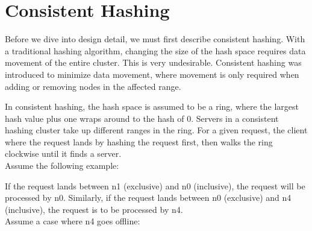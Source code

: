 \section{Consistent Hashing}

Before we dive into design detail, we must first describe consistent hashing.
With a traditional hashing algorithm, changing the size of the hash space
requires data movement of the entire cluster. This is very undesirable.
Consistent hashing was introduced to minimize data movement, where movement is
only required when adding or removing nodes in the affected range. 

In consistent hashing, the hash space is assumed to be a ring, where the largest
hash value plus one wraps around to the hash of 0. Servers in a consistent
hashing cluster take up different ranges in the ring. For a given request, the
client where the request lands by hashing the request first, then walks the ring
clockwise until it finds a server. \\ 

Assume the following example:

\begin{center}
\end{center}

If the request lands between n1 (exclusive) and n0 (inclusive), the request will
be processed by n0. Similarly, if the request lands between n0 (exclusive) and
n4 (inclusive), the request is to be processed by n4.\\

Assume a case where n4 goes offline: 

\begin{center}
\end{center}

